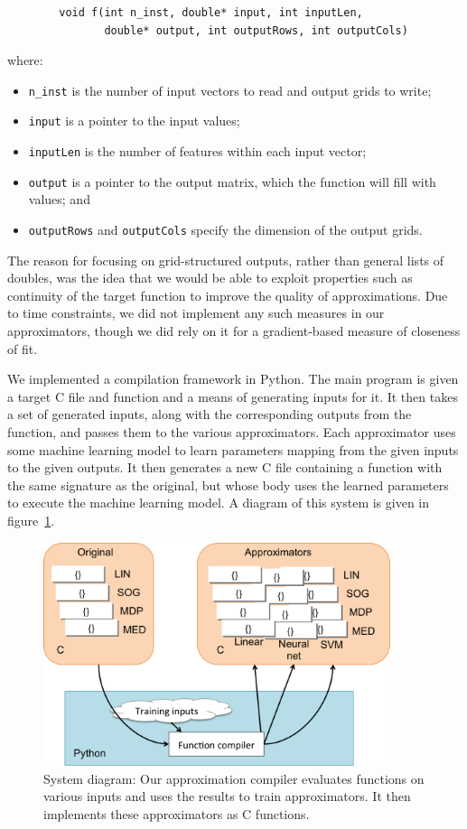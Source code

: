 \documentclass{article}
\begin{document}
\begin{verbatim}
        void f(int n_inst, double* input, int inputLen,
               double* output, int outputRows, int outputCols)
\end{verbatim}
where:
\begin{itemize}
\item {\tt n\_inst} is the number of input vectors to read and output grids to write;
\item {\tt input} is a pointer to the input values;
\item {\tt inputLen} is the number of features within each input vector;
\item {\tt output} is a pointer to the output matrix, which the function will fill with values; and
\item {\tt outputRows} and {\tt outputCols} specify the dimension of the output grids.
\end{itemize}

The reason for focusing on grid-structured outputs, rather than general lists of doubles, was the idea that we would be able to exploit properties such as continuity of the target function to improve the quality of approximations. Due to time constraints, we did not implement any such measures in our approximators, though we did rely on it for a gradient-based measure of closeness of fit.

We implemented a compilation framework in Python. The main program is given a target C file and function and a means of generating inputs for it. It then takes a set of generated inputs, along with the corresponding outputs from the function, and passes them to the various approximators. Each approximator uses some machine learning model to learn parameters mapping from the given inputs to the given outputs. It then generates a new C file containing a function with the same signature as the original, but whose body uses the learned parameters to execute the machine learning model. A diagram of this system is given in figure~\ref{fig:system}.

\begin{figure}
  \centering
  \includegraphics[width=4in]{images/diagram.png}
  \caption{System diagram: Our approximation compiler evaluates functions on various inputs and uses the results to train approximators. It then implements these approximators as C functions.}
  \label{fig:system}
\end{figure}
\end{document}
